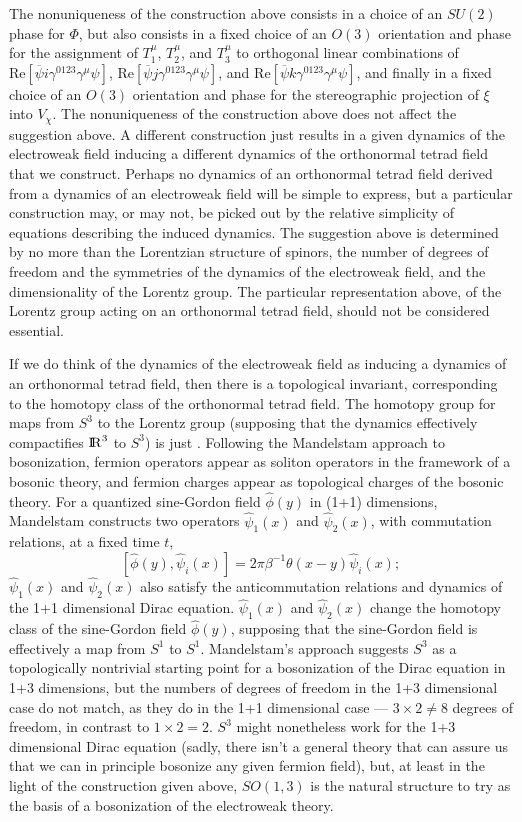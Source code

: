 \documentclass[a4paper,twocolumn,showpacs,preprintnumbers,aps]{revtex4}
\begin{document}
The nonuniqueness of the construction above consists in a choice of an $SU(2)$ phase
for $\Phi$, but also consists in a fixed choice of an $O(3)$ orientation and phase for the
assignment of $T^\mu_{1}$, $T^\mu_{2}$, and $T^\mu_{3}$ to orthogonal linear
combinations of
$\mathrm{Re}[\overline{\psi}i\gamma^{0123}\gamma^\mu\psi]$,
$\mathrm{Re}[\overline{\psi}j\gamma^{0123}\gamma^\mu\psi]$, and
$\mathrm{Re}[\overline{\psi}k\gamma^{0123}\gamma^\mu\psi]$,
and finally in a fixed choice of an $O(3)$ orientation and phase for the stereographic
projection of $\xi$ into $V_\chi$.
The nonuniqueness of the construction above does not affect the suggestion
above. A different construction just results in a given dynamics of the electroweak field
inducing a different dynamics of the orthonormal tetrad field that we construct.
Perhaps no dynamics of an orthonormal tetrad field derived from a dynamics of an
electroweak field will be simple to express, but a particular construction may, or may not,
be picked out by the relative simplicity of equations describing the induced dynamics.
The suggestion above is determined by no more than the Lorentzian structure of
spinors, the number of degrees of freedom and the symmetries of the dynamics
of the electroweak field, and the dimensionality of the Lorentz group. The particular
representation above, of the Lorentz group acting on an orthonormal tetrad field,
should not be considered essential.

If we do think of the dynamics of the electroweak field as inducing a dynamics
of an orthonormal tetrad field, then there is a topological invariant, corresponding
to the homotopy class of the orthonormal tetrad field. The homotopy group for
maps from $S^3$ to the Lorentz group (supposing that the dynamics effectively
compactifies ${\mathrm{I\hspace{-.2em}R}}^3$ to $S^3$) is just \ZZ. Following the Mandelstam approach
to bosonization\cite{Mandelstam}, fermion operators appear as soliton operators
in the framework of a bosonic theory, and fermion charges appear as topological
charges of the bosonic theory\cite{Marino}. 
For a quantized sine-Gordon field $\hat\phi(y)$ in (1+1) dimensions, Mandelstam
constructs two operators $\hat\psi_1(x)$ and $\hat\psi_2(x)$, with commutation
relations, at a fixed time $t$,
$$[\hat\phi(y),\hat\psi_i(x)]=2\pi\beta^{-1}\theta(x-y)\hat\psi_i(x);$$
$\hat\psi_1(x)$ and $\hat\psi_2(x)$ also satisfy the anticommutation relations
and dynamics of the 1+1 dimensional Dirac equation. $\hat\psi_1(x)$ and
$\hat\psi_2(x)$ change the homotopy class of the sine-Gordon field
$\hat\phi(y)$, supposing that the sine-Gordon field is effectively a map
from $S^1$ to $S^1$. Mandelstam's approach suggests
$S^3$ as a topologically nontrivial starting point for a bosonization of the Dirac
equation in 1+3 dimensions, but the numbers of degrees of freedom in the 1+3
dimensional case do not match, as they do in the 1+1 dimensional case ---
$3\times 2\ne 8$ degrees of freedom, in contrast to $1\times 2=2$. $S^3$ might
nonetheless work for the 1+3 dimensional Dirac equation (sadly, there isn't a general
theory that can assure us that we can in principle bosonize any given fermion field),
but, at least in the light of the construction given above, $SO(1,3)$ is the natural
structure to try as the basis of a bosonization of the electroweak theory.
\end{document}
